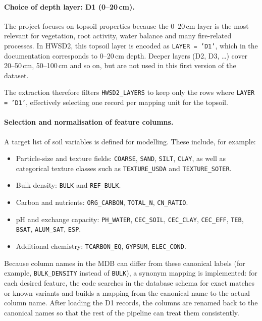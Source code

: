 \paragraph{Choice of depth layer: D1 (0--20\,cm).}

The project focuses on topsoil properties because the 0--20\,cm layer is the
most relevant for vegetation, root activity, water balance and many fire-related
processes. In HWSD2, this topsoil layer is encoded as \texttt{LAYER = 'D1'},
which in the documentation corresponds to 0--20\,cm depth. Deeper layers (D2,
D3, \dots) cover 20--50\,cm, 50--100\,cm and so on, but are not used in this
first version of the dataset.

The extraction therefore filters \texttt{HWSD2\_LAYERS} to keep only the rows
where \texttt{LAYER = 'D1'}, effectively selecting one record per mapping unit
for the topsoil.

\paragraph{Selection and normalisation of feature columns.}

A target list of soil variables is defined for modelling. These include, for
example:

\begin{itemize}
    \item Particle-size and texture fields: \texttt{COARSE}, \texttt{SAND},
    \texttt{SILT}, \texttt{CLAY}, as well as categorical texture classes such
    as \texttt{TEXTURE\_USDA} and \texttt{TEXTURE\_SOTER}.
    \item Bulk density: \texttt{BULK} and \texttt{REF\_BULK}.
    \item Carbon and nutrients: \texttt{ORG\_CARBON}, \texttt{TOTAL\_N},
    \texttt{CN\_RATIO}.
    \item pH and exchange capacity: \texttt{PH\_WATER}, \texttt{CEC\_SOIL},
    \texttt{CEC\_CLAY}, \texttt{CEC\_EFF}, \texttt{TEB}, \texttt{BSAT},
    \texttt{ALUM\_SAT}, \texttt{ESP}.
    \item Additional chemistry: \texttt{TCARBON\_EQ}, \texttt{GYPSUM},
    \texttt{ELEC\_COND}.
\end{itemize}

Because column names in the MDB can differ from these canonical labels (for
example, \texttt{BULK\_DENSITY} instead of \texttt{BULK}), a synonym mapping is
implemented: for each desired feature, the code searches in the database schema
for exact matches or known variants and builds a mapping from the canonical
name to the actual column name. After loading the D1 records, the columns are
renamed back to the canonical names so that the rest of the pipeline can treat
them consistently.

